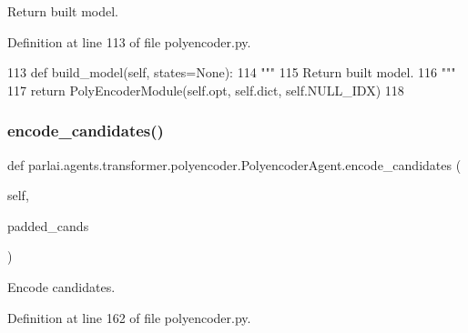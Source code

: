 \begin{DoxyVerb}Return built model.
\end{DoxyVerb}
 

Definition at line 113 of file polyencoder.\+py.


\begin{DoxyCode}
113     \textcolor{keyword}{def }build\_model(self, states=None):
114         \textcolor{stringliteral}{"""}
115 \textcolor{stringliteral}{        Return built model.}
116 \textcolor{stringliteral}{        """}
117         \textcolor{keywordflow}{return} PolyEncoderModule(self.opt, self.dict, self.NULL\_IDX)
118 
\end{DoxyCode}
\mbox{\label{classparlai_1_1agents_1_1transformer_1_1polyencoder_1_1PolyencoderAgent_ae73fe8d98b46a7ef18ef7115f29c999d}} 
\subsubsection{\texorpdfstring{encode\+\_\+candidates()}{encode\_candidates()}}
{\footnotesize\ttfamily def parlai.\+agents.\+transformer.\+polyencoder.\+Polyencoder\+Agent.\+encode\+\_\+candidates (\begin{DoxyParamCaption}\item[{}]{self,  }\item[{}]{padded\+\_\+cands }\end{DoxyParamCaption})}

\begin{DoxyVerb}Encode candidates.
\end{DoxyVerb}
 

Definition at line 162 of file polyencoder.\+py.


